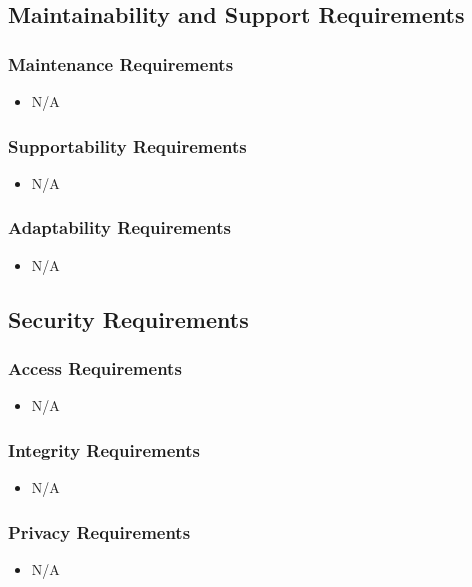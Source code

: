 \documentclass [12pt]{article}
\begin{document}
\subsection{Maintainability and Support Requirements }
\subsubsection{Maintenance Requirements }
	\begin{itemize}
		\item N/A
	\end{itemize}

\subsubsection{Supportability Requirements }
	\begin{itemize}
		\item N/A
	\end{itemize}

\subsubsection{Adaptability Requirements}
	\begin{itemize}
		\item N/A
	\end{itemize}

\subsection{Security Requirements }
\subsubsection{Access Requirements }
	\begin{itemize}
		\item N/A
	\end{itemize}

\subsubsection{Integrity Requirements }
	\begin{itemize}
		\item N/A
	\end{itemize}

\subsubsection{Privacy Requirements }
	\begin{itemize}
		\item N/A
	\end{itemize}
\end{document}
